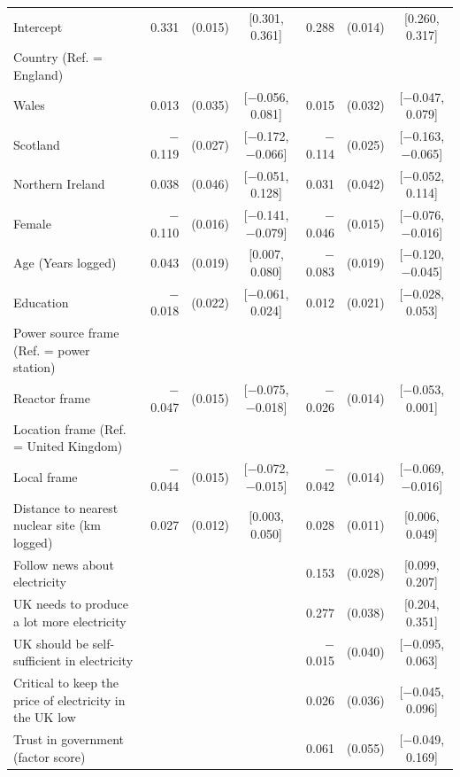 \begin{landscape}
\begin{longtable}[t]{>{\raggedright\arraybackslash}p{2.8in}rrcrrc}
\endfoot
\bottomrule
\endlastfoot
Intercept & 0.331 & (0.015) & {}[0.301, 0.361] & 0.288 & (0.014) & {}[0.260, 0.317]\\
Country (Ref. = England) &  &  &  &  &  & \\
\hspace{1em}Wales & 0.013 & (0.035) & {}[$-$0.056, 0.081] & 0.015 & (0.032) & {}[$-$0.047, 0.079]\\
\hspace{1em}Scotland & $-$0.119 & (0.027) & {}[$-$0.172, $-$0.066] & $-$0.114 & (0.025) & {}[$-$0.163, $-$0.065]\\
\hspace{1em}Northern Ireland & 0.038 & (0.046) & {}[$-$0.051, 0.128] & 0.031 & (0.042) & {}[$-$0.052, 0.114]\\
Female & $-$0.110 & (0.016) & {}[$-$0.141, $-$0.079] & $-$0.046 & (0.015) & {}[$-$0.076, $-$0.016]\\
Age (Years logged) & 0.043 & (0.019) & {}[0.007, 0.080] & $-$0.083 & (0.019) & {}[$-$0.120, $-$0.045]\\
Education & $-$0.018 & (0.022) & {}[$-$0.061, 0.024] & 0.012 & (0.021) & {}[$-$0.028, 0.053]\\
Power source frame (Ref. = power station) &  &  &  &  &  & \\
\hspace{1em}Reactor frame & $-$0.047 & (0.015) & {}[$-$0.075, $-$0.018] & $-$0.026 & (0.014) & {}[$-$0.053, 0.001]\\
Location frame (Ref. = United Kingdom) &  &  &  &  &  & \\
\hspace{1em}Local frame & $-$0.044 & (0.015) & {}[$-$0.072, $-$0.015] & $-$0.042 & (0.014) & {}[$-$0.069, $-$0.016]\\
Distance to nearest nuclear site (km logged) & 0.027 & (0.012) & {}[0.003, 0.050] & 0.028 & (0.011) & {}[0.006, 0.049]\\
Follow news about electricity &  &  &  & 0.153 & (0.028) & {}[0.099, 0.207]\\
UK needs to produce a lot more electricity &  &  &  & 0.277 & (0.038) & {}[0.204, 0.351]\\
UK should be self-sufficient in electricity &  &  &  & $-$0.015 & (0.040) & {}[$-$0.095, 0.063]\\
Critical to keep the price of electricity in the UK low &  &  &  & 0.026 & (0.036) & {}[$-$0.045, 0.096]\\
Trust in government (factor score) &  &  &  & 0.061 & (0.055) & {}[$-$0.049, 0.169]\\

\end{longtable}
\end{landscape}
